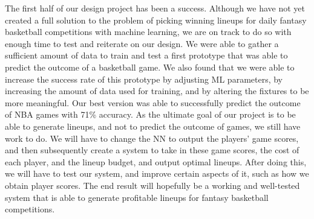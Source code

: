 The first half of our design project has been a success. Although we have not yet created a full solution to the problem of picking winning lineups for daily fantasy basketball competitions with machine learning, we are on track to do so with enough time to test and reiterate on our design. We were able to gather a sufficient amount of data to train and test a first prototype that was able to predict the outcome of a basketball game. We also found that we were able to increase the success rate of this prototype by adjusting ML parameters, by increasing the amount of data used for training, and by altering the fixtures to be more meaningful. Our best version was able to successfully predict the outcome of NBA games with 71\% accuracy. As the ultimate goal of our project is to be able to generate lineups, and not to predict the outcome of games, we still have work to do. We will have to change the NN to output the players' game scores, and then subsequently create a system to take in these game scores, the cost of each player, and the lineup budget, and output optimal lineups. After doing this, we will have to test our system, and improve certain aspects of it, such as how we obtain player scores. The end result will hopefully be a working and well-tested system that is able to generate profitable lineups for fantasy basketball competitions.